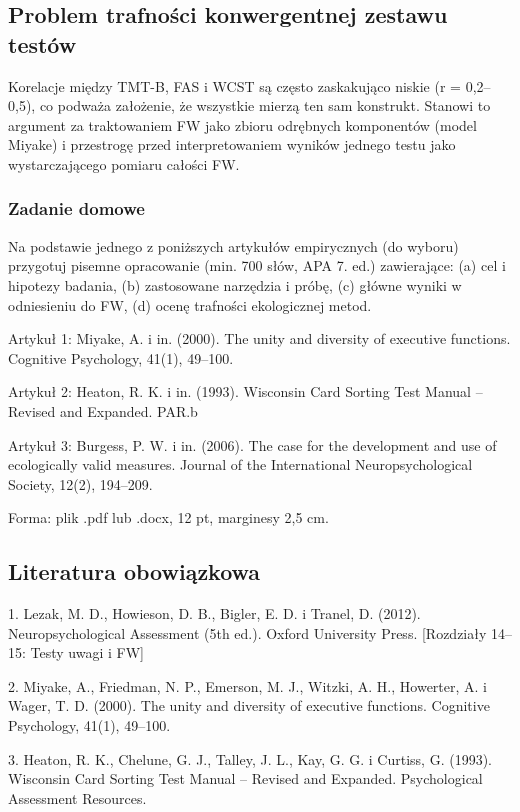 \documentclass[11pt,a4paper]{article}
\begin{document}
\subsection{Problem trafności konwergentnej zestawu testów}
Korelacje między TMT-B, FAS i WCST są często zaskakująco niskie (r = 0,2–0,5), co podważa założenie, że wszystkie mierzą ten sam konstrukt. Stanowi to argument za traktowaniem FW jako zbioru odrębnych komponentów (model Miyake) i przestrogę przed interpretowaniem wyników jednego testu jako wystarczającego pomiaru całości FW.

\subsubsection*{Zadanie domowe}
Na podstawie jednego z poniższych artykułów empirycznych (do wyboru) przygotuj pisemne opracowanie (min. 700 słów, APA 7. ed.) zawierające: (a) cel i hipotezy badania, (b) zastosowane narzędzia i próbę, (c) główne wyniki w odniesieniu do FW, (d) ocenę trafności ekologicznej metod.

Artykuł 1: Miyake, A. i in. (2000). The unity and diversity of executive functions. Cognitive Psychology, 41(1), 49–100.

Artykuł 2: Heaton, R. K. i in. (1993). Wisconsin Card Sorting Test Manual – Revised and Expanded. PAR.b

Artykuł 3: Burgess, P. W. i in. (2006). The case for the development and use of ecologically valid measures. Journal of the International Neuropsychological Society, 12(2), 194–209.

Forma: plik .pdf lub .docx, 12 pt, marginesy 2,5 cm.

\subsection{Literatura obowiązkowa}

1. Lezak, M. D., Howieson, D. B., Bigler, E. D. i Tranel, D. (2012). Neuropsychological Assessment (5th ed.). Oxford University Press. [Rozdziały 14–15: Testy uwagi i FW]

2. Miyake, A., Friedman, N. P., Emerson, M. J., Witzki, A. H., Howerter, A. i Wager, T. D. (2000). The
unity and diversity of executive functions. Cognitive Psychology, 41(1), 49–100.

3. Heaton, R. K., Chelune, G. J., Talley, J. L., Kay, G. G. i Curtiss, G. (1993). Wisconsin Card Sorting Test Manual – Revised and Expanded. Psychological Assessment Resources.
\end{document}
